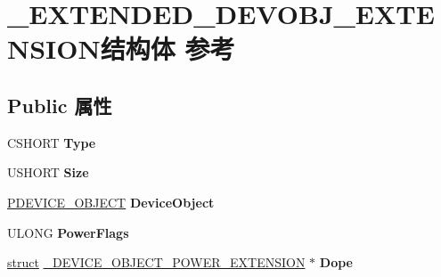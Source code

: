 \hypertarget{struct___e_x_t_e_n_d_e_d___d_e_v_o_b_j___e_x_t_e_n_s_i_o_n}{}\section{\+\_\+\+E\+X\+T\+E\+N\+D\+E\+D\+\_\+\+D\+E\+V\+O\+B\+J\+\_\+\+E\+X\+T\+E\+N\+S\+I\+O\+N结构体 参考}
\label{struct___e_x_t_e_n_d_e_d___d_e_v_o_b_j___e_x_t_e_n_s_i_o_n}
\subsection*{Public 属性}
\begin{DoxyCompactItemize}
\item 
\mbox{\label{struct___e_x_t_e_n_d_e_d___d_e_v_o_b_j___e_x_t_e_n_s_i_o_n_a69d07e49a93eaee3233a2a1f39293951}} 
C\+S\+H\+O\+RT {\bfseries Type}
\item 
\mbox{\label{struct___e_x_t_e_n_d_e_d___d_e_v_o_b_j___e_x_t_e_n_s_i_o_n_ad002b3203a63ce421dc27de922646115}} 
U\+S\+H\+O\+RT {\bfseries Size}
\item 
\mbox{\label{struct___e_x_t_e_n_d_e_d___d_e_v_o_b_j___e_x_t_e_n_s_i_o_n_a78b91e384146496af06c255a762968db}} 
\hyperlink{struct___d_e_v_i_c_e___o_b_j_e_c_t}{P\+D\+E\+V\+I\+C\+E\+\_\+\+O\+B\+J\+E\+CT} {\bfseries Device\+Object}
\item 
\mbox{\label{struct___e_x_t_e_n_d_e_d___d_e_v_o_b_j___e_x_t_e_n_s_i_o_n_a8debc7758f1189f7f9dcb0fa3dd63d87}} 
U\+L\+O\+NG {\bfseries Power\+Flags}
\item 
\mbox{\label{struct___e_x_t_e_n_d_e_d___d_e_v_o_b_j___e_x_t_e_n_s_i_o_n_a37cc0f1d28929870b975dcbfe2eb49bb}} 
\hyperlink{interfacestruct}{struct} \hyperlink{struct___d_e_v_i_c_e___o_b_j_e_c_t___p_o_w_e_r___e_x_t_e_n_s_i_o_n}{\+\_\+\+D\+E\+V\+I\+C\+E\+\_\+\+O\+B\+J\+E\+C\+T\+\_\+\+P\+O\+W\+E\+R\+\_\+\+E\+X\+T\+E\+N\+S\+I\+ON} $\ast$ {\bfseries Dope}

\end{DoxyCompactItemize}
